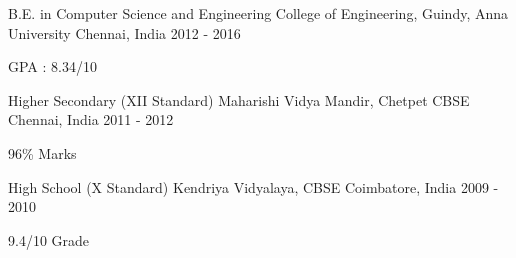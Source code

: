 

\begin{cventries}

  \cventry
    {B.E. in Computer Science and Engineering} %
    {College of Engineering, Guindy, Anna University} %
    {Chennai, India} %
    {2012 - 2016} %
    {
      \begin{cvitems} %
        \item {GPA : 8.34/10}
      \end{cvitems}
    }
  \begin{adjustwidth}{0mm}{0mm}
  \cventry
    {Higher  Secondary  (XII  Standard)} %
    {Maharishi  Vidya  Mandir, Chetpet CBSE} %
    {Chennai, India} %
    {2011 - 2012} %
    {
      \begin{cvitems} %
        \item {96\% Marks}
      \end{cvitems}
    }
  \end{adjustwidth}
  \begin{adjustwidth}{0mm}{0mm}
  \cventry
    {High  School  (X  Standard)} %
    {Kendriya  Vidyalaya, CBSE} %
    {Coimbatore, India} %
    {2009 - 2010} %
    {
      \begin{cvitems} %
        \item {9.4/10 Grade}
      \end{cvitems}
    }
  \end{adjustwidth}
\end{cventries}

